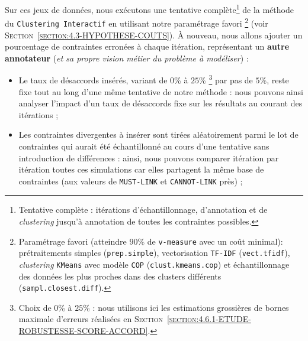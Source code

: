 			Sur ces jeux de données, nous exécutons une tentative complète\footnote{
				Tentative complète : itérations d'échantillonnage, d'annotation et de \textit{clustering} jusqu'à annotation de toutes les contraintes possibles.
			}
			de la méthode du \texttt{Clustering Interactif} en utilisant notre paramétrage favori \footnote{
				Paramétrage favori (atteindre $90$\% de \texttt{v-measure} avec un coût minimal): prétraitements simples (\texttt{prep.simple}), vectorisation \texttt{TF-IDF} (\texttt{vect.tfidf}), \textit{clustering} \texttt{KMeans} avec modèle \texttt{COP} (\texttt{clust.kmeans.cop}) et échantillonnage des données les plus proches dans des clusters différents (\texttt{sampl.closest.diff}).
			} (voir \textsc{Section~\ref{section:4.3-HYPOTHESE-COUTS}}).
			À nouveau, nous allons ajouter un pourcentage de contraintes erronées à chaque itération, représentant un \textbf{autre annotateur} (\textit{et sa propre vision métier du problème à modéliser}) :
			\begin{itemize}
				\item Le taux de désaccords insérés, variant de $0$\% à $25$\% \footnote{
					Choix de $0$\% à $25$\% : nous utilisons ici les estimations grossières de bornes maximale d'erreurs réalisées en \textsc{Section~\ref{section:4.6.1-ETUDE-ROBUSTESSE-SCORE-ACCORD}}.
				} par pas de $5$\%, reste fixe tout au long d'une même tentative de notre méthode : nous pouvons ainsi analyser l'impact d'un taux de désaccords fixe sur les résultats au courant des itérations ;
				\item Les contraintes divergentes à insérer sont tirées aléatoirement parmi le lot de contraintes qui aurait été échantillonné au cours d'une tentative sans introduction de différences : ainsi, nous pouvons comparer itération par itération toutes ces simulations car elles partagent la même base de contraintes (aux valeurs de \texttt{MUST-LINK} et \texttt{CANNOT-LINK} près) ;
			\end{itemize}
			
